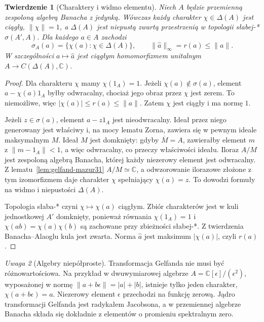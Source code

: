 \documentclass[11pt,a4paper]{article}
\numberwithin{equation}{section}
\theoremstyle{plain}
\newtheorem{twierdzenie}{Twierdzenie}[section]
\theoremstyle{definition}
\theoremstyle{remark}
\newtheorem{uwaga}[twierdzenie]{Uwaga}
\newcommand{\C}{\mathbb C}
\begin{document}
\begin{twierdzenie}[Charaktery i widmo elementu]
\label{thm:gelfand-spectrum31}
Niech $A$ będzie przemienną zespoloną algebrą Banacha z jedynką.
Wówczas każdy charakter $\chi\in\Delta(A)$ jest ciągły,
$\|\chi\|=1$, a $\Delta(A)$ jest niepustą zwartą przestrzenią
w topologii słabej-* $\sigma(A',A)$. Dla każdego $a\in A$ zachodzi
\[
 \sigma_A(a)=\{\chi(a):\chi\in\Delta(A)\},\qquad
 \|\widehat a\|_\infty=r(a)\le\|a\|.
\]
W szczególności $a\mapsto\widehat a$ jest ciągłym homomorfizmem
unitalnym $A\to C(\Delta(A),\C)$.
\end{twierdzenie}
\begin{proof}
Dla charakteru $\chi$ mamy $\chi(1_A)=1$.
Jeżeli $\chi(a)\notin\sigma(a)$, element $a-\chi(a)1_A$
byłby odwracalny, chociaż jego obraz przez $\chi$ jest zerem.
To niemożliwe, więc $|\chi(a)|\le r(a)\le\|a\|$.
Zatem $\chi$ jest ciągły i ma normę $1$.

Jeżeli $z\in\sigma(a)$, element $a-z1_A$ jest nieodwracalny.
Ideał przez niego generowany jest właściwy i, na mocy lematu Zorna,
zawiera się w pewnym ideale maksymalnym $M$. Ideał $M$ jest domknięty:
gdyby $\overline M=A$, zawierałby element $m$ z $\|m-1_A\|<1$,
a więc odwracalny, co przeczy właściwości ideału.
Iloraz $A/M$ jest zespoloną algebrą Banacha, której każdy niezerowy
element jest odwracalny. Z lematu~\ref{lem:gelfand-mazur31}
$A/M\simeq\C$, a odwzorowanie ilorazowe złożone z tym
izomorfizmem daje charakter $\chi$ spełniający $\chi(a)=z$.
To dowodzi formuły na widmo i niepustości $\Delta(A)$.

Topologia słaba-* czyni $\chi\mapsto\chi(a)$ ciągłym.
Zbiór charakterów jest w kuli jednostkowej $A'$ domknięty,
ponieważ równania $\chi(1_A)=1$ i
$\chi(ab)=\chi(a)\chi(b)$ są zachowane przy zbieżności słabej-*.
Z twierdzenia Banacha--Alaoglu kula jest zwarta.
Norma $\widehat a$ jest maksimum $|\chi(a)|$, czyli $r(a)$.
\end{proof}

\begin{uwaga}[Algebry niepółproste]
Transformacja Gelfanda nie musi być różnowartościowa.
Na przykład w dwuwymiarowej algebrze
$A=\C[\epsilon]/(\epsilon^2)$, wyposażonej w normę
$\|a+b\epsilon\|=|a|+|b|$, istnieje tylko jeden charakter,
$\chi(a+b\epsilon)=a$. Niezerowy element $\epsilon$ przechodzi na
funkcję zerową. Jądro transformacji Gelfanda jest radykałem
Jacobsona, a w przemiennej algebrze Banacha składa się dokładnie
z elementów o promieniu spektralnym zero.
\end{uwaga}
\end{document}
